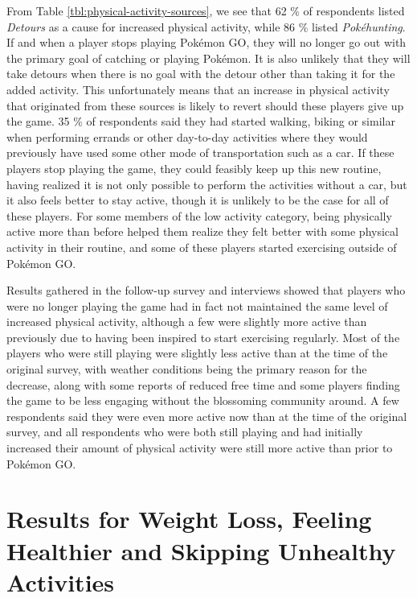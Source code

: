 
From Table \ref{tbl:physical-activity-sources}, we see that 62 \% of respondents listed \emph{Detours} as a cause for increased physical activity, while 86 \% listed \emph{Pokéhunting}. If and when a player stops playing Pokémon GO, they will no longer go out with the primary goal of catching or playing Pokémon. It is also unlikely that they will take detours when there is no goal with the detour other than taking it for the added activity. This unfortunately means that an increase in physical activity that originated from these sources is likely to revert should these players give up the game. 35 \% of respondents said they had started walking, biking or similar when performing errands or other day-to-day activities where they would previously have used some other mode of transportation such as a car. If these players stop playing the game, they could feasibly keep up this new routine, having realized it is not only possible to perform the activities without a car, but it also feels better to stay active, though it is unlikely to be the case for all of these players. For some members of the low activity category, being physically active more than before helped them realize they felt better with some physical activity in their routine, and some of these players started exercising outside of Pokémon GO. 

Results gathered in the follow-up survey and interviews showed that players who were no longer playing the game had in fact not maintained the same level of increased physical activity, although a few were slightly more active than previously due to having been inspired to start exercising regularly. Most of the players who were still playing were slightly less active than at the time of the original survey, with weather conditions being the primary reason for the decrease, along with some reports of reduced free time and some players finding the game to be less engaging without the blossoming community around. A few respondents said they were even more active now than at the time of the original survey, and all respondents who were both still playing and had initially increased their amount of physical activity were still more active than prior to Pokémon GO.


\section{Results for Weight Loss, Feeling Healthier and Skipping Unhealthy Activities}


